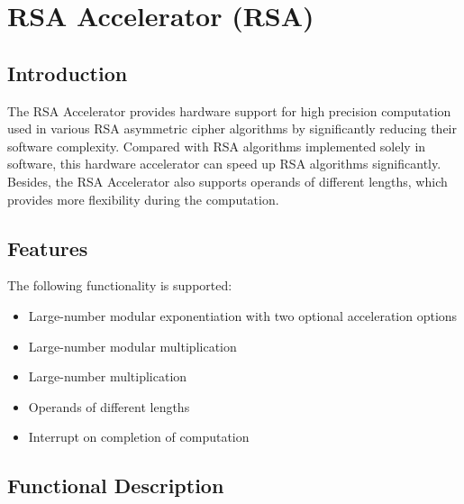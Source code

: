 \documentclass[main\_\_EN.tex]{subfiles}
\begin{document}

\ifglobal
\else
    {\let\clearpage\relax \listoftodos}
    \tableofcontents
\fi



\hypertarget{rsa}{}

\chapter{RSA Accelerator (RSA)}\label{mod:rsa}

\section{Introduction}

The RSA Accelerator provides hardware support for high precision computation used in various RSA asymmetric cipher algorithms by significantly reducing their software complexity. Compared with RSA algorithms implemented solely in software, this hardware accelerator can speed up RSA algorithms significantly. Besides, the RSA Accelerator also supports operands of different lengths, which provides more flexibility during the computation.

\section{Features}

The following functionality is supported:

\begin{itemize}
    \item Large-number modular exponentiation with two optional acceleration options
    \item Large-number modular multiplication
    \item Large-number multiplication
    \item Operands of different lengths
    \item Interrupt on completion of computation
\end{itemize}


\section{Functional Description}
\end{document}
